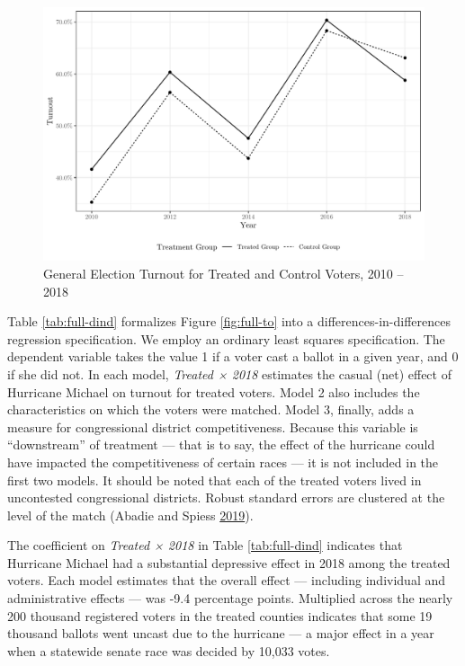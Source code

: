 \documentclass[
  12pt,
]{article}
\begin{document}
\begin{figure}[H]

{\centering \includegraphics{hurricane_michael_files/figure-latex/full-to-chunk-1} 

}

\caption{\label{fig:full-to}General Election Turnout for Treated and Control Voters, 2010 -- 2018}\label{fig:full-to-chunk}
\end{figure}

Table \ref{tab:full-dind} formalizes Figure \ref{fig:full-to} into a differences-in-differences regression specification. We employ an ordinary least squares specification. The dependent variable takes the value 1 if a voter cast a ballot in a given year, and 0 if she did not. In each model, \emph{Treated × 2018} estimates the casual (net) effect of Hurricane Michael on turnout for treated voters. Model 2 also includes the characteristics on which the voters were matched. Model 3, finally, adds a measure for congressional district competitiveness. Because this variable is ``downstream'' of treatment --- that is to say, the effect of the hurricane could have impacted the competitiveness of certain races --- it is not included in the first two models. It should be noted that each of the treated voters lived in uncontested congressional districts. Robust standard errors are clustered at the level of the match (Abadie and Spiess \protect\hyperlink{ref-Abadie2019}{2019}).

\begin{singlespace}

\end{singlespace}

The coefficient on \emph{Treated × 2018} in Table \ref{tab:full-dind} indicates that Hurricane Michael had a substantial depressive effect in 2018 among the treated voters. Each model estimates that the overall effect --- including individual and administrative effects --- was -9.4 percentage points. Multiplied across the nearly 200 thousand registered voters in the treated counties indicates that some 19 thousand ballots went uncast due to the hurricane --- a major effect in a year when a statewide senate race was decided by 10,033 votes.
\end{document}
